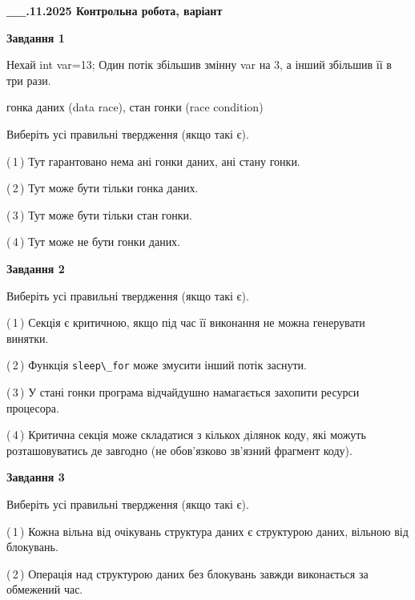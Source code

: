 \documentclass[12pt, ukrainian]{article}
\def\code#1{\Verb!#1!}
\begin{document}
\begin {large}

\textbf{\_\_.11.2025 Контрольна робота, варіант  }\par


{

\begin{center}
\textbf{Завдання 1}
\end{center}
Нехай int var=13; Один потік збільшив змінну var на 3, а інший збільшив її в три рази.

гонка даних (data race), стан гонки (race condition)

Виберіть усі правильні твердження (якщо такі є).\par
\vspace{2mm}
(\,1\,) Тут гарантовано нема ані гонки даних, ані стану гонки.%

(\,2\,) Тут може бути тільки гонка даних.%

(\,3\,) Тут може бути тільки стан гонки.%

(\,4\,) Тут може не бути гонки даних.%



\begin{center}
\textbf{Завдання 2}
\end{center}
Виберіть усі правильні твердження (якщо такі є).\par
\vspace{2mm}

(\,1\,) Секція є критичною, якщо під час її виконання не можна генерувати винятки.%

(\,2\,) Функція \code{sleep\_for} може змусити інший потік заснути.%

(\,3\,) У стані гонки програма відчайдушно намагається захопити ресурси процесора.%

(\,4\,) Критична секція може складатися з кількох ділянок коду, які можуть розташовуватись де завгодно (не обов’язково зв’язний фрагмент коду).%



\begin{center}
\textbf{Завдання 3}
\end{center}
Виберіть усі правильні твердження (якщо такі є).\par
\vspace{2mm}

(\,1\,) Кожна вільна від очікувань структура даних є структурою даних, вільною від блокувань.%

(\,2\,) Операція над структурою даних без блокувань завжди виконається за обмежений час.%

}
\end{large}
\end{document}
